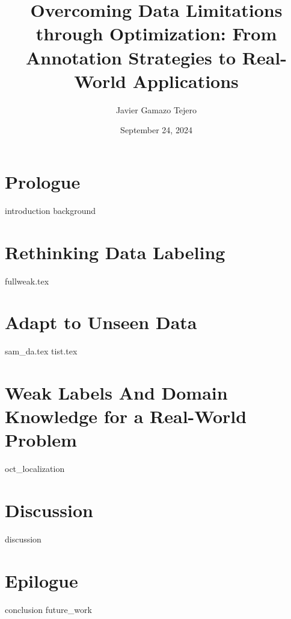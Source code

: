 \documentclass[
    10pt,
	colorful,
	boxey,
 a4paper,
]{tufte-style-thesis}
\author{Javier Gamazo Tejero}
\title{Overcoming Data Limitations through Optimization: From Annotation Strategies to Real-World Applications}
\date{September 24, 2024}
\begin{document}
\ifdebug
    \layout
\fi


\frontmatter

\cleardoublepage
{}
\pagestyle{empty}
\begin{wide}

\end{wide}






\tableofcontents
\listoffigures
\listoftables

\clearpage
\pagestyle{fancy}


\mainmatter
{}

\part{Prologue}
{introduction}
{background}
\part{Rethinking Data Labeling}
{fullweak.tex}
\part{Adapt to Unseen Data}
{sam_da.tex}
{tist.tex}
\part{Weak Labels And Domain Knowledge for a Real-World Problem}
{oct_localization}
\part{Discussion}
{discussion}
\part{Epilogue}
{conclusion}
{future_work}


\thispagestyle{empty}
\printbibliography
\cleardoublepage
\end{document}
